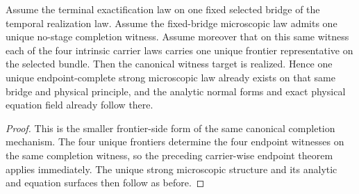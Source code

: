 \begin{theorem}
\label{thm:canonical-completion-witness-frontier-target-implies-canonical-flagship-witness-target}
Assume the terminal exactification law on one fixed selected bridge of the
temporal realization law. Assume the fixed-bridge microscopic law admits one
unique no-stage completion witness. Assume moreover that on this same witness
each of the four intrinsic carrier laws carries one unique frontier representative on the
selected bundle. Then the canonical witness target is
realized. Hence one unique endpoint-complete strong microscopic law already
exists on that same bridge and physical principle, and the analytic normal forms
and exact physical equation field already follow there.
\end{theorem}

\begin{proof}
This is the smaller frontier-side form of the same canonical completion
mechanism. The four unique frontiers determine the four endpoint witnesses on
the same completion witness, so the preceding carrier-wise endpoint theorem
applies immediately. The unique strong microscopic structure and its analytic and
equation surfaces then follow as before.
\end{proof}

